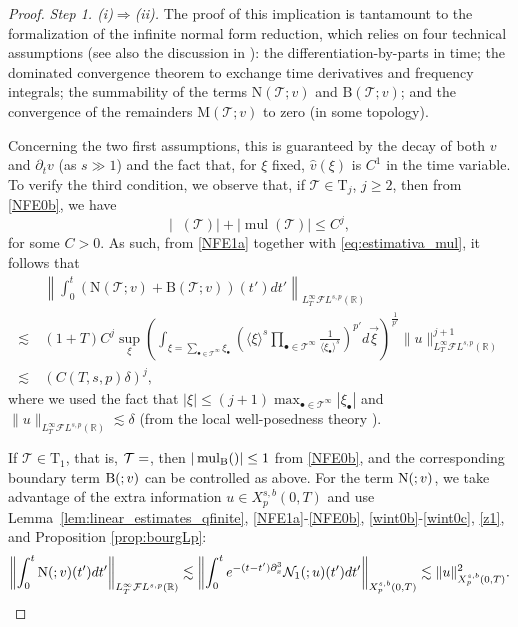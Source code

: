 \documentclass[a4paper,
11pt,  reqno]{amsart}
\makeatletter
\newcommand{\jap}[1]{\langle #1 \rangle}
\newcommand{\5}{\textup{V}}
\newcommand{\FL}{\mathcal{F} L}
\newcommand{\ft}{\widehat}
\newcommand{\dx}{\partial_x}
\newcommand{\dt}{\partial_t}
\theoremstyle{remark}
\newcommand{\R}{\mathbb{R}}
\newcommand{\bul}{\bullet}
\newcommand{\TT}{\mathcal{T}}
\newcommand{\Tr}{\mathrm{T}}
\DeclareMathOperator{\mul}{mul}
\DeclareMathOperator{\mulB}{mul_{\BB}}
\def\<#1>{\csname MH@symb@#1\endcsname}
\numberwithin{equation}{section}
\numberwithin{theorem}{section}
\newcommand{\MM}{\mathrm{M}}
\newcommand{\NN}{\mathrm{N}}
\newcommand{\Ncal}{\mathcal{N}}
\newcommand{\BB}{\mathrm{B}}
\makeatother
\begin{document}
\begin{proof}
    \textit{Step 1. \rm(i)$\Rightarrow$\rm(ii).} The proof of this implication is tantamount to the formalization of the infinite normal form reduction, which relies on four technical assumptions (see also the discussion in \cite[Section 4]{KOY20}): the differentiation-by-parts in time; the dominated convergence theorem to exchange time derivatives and frequency integrals; the summability of the terms $\NN(\TT;v)$ and $\BB(\TT;v)$; and the convergence of the remainders $\MM(\TT;v)$ to zero (in some topology).
	
	Concerning the two first assumptions, this is guaranteed by the decay of both $v$ and $\dt v$ (as $s\gg 1$) and the fact that, for $\xi$ fixed, {$\ft{v}(\xi)$} is $C^1$ in the time variable.
	To verify the third condition, we observe that, if $\TT\in \Tr_{j}$, $j\ge 2$, then from \eqref{NFE0b},  we have
    \begin{equation}\label{eq:estimativa_mul}
        |\mulB(\TT)| + |\mul(\TT)|\le C^j,
    \end{equation}
    for some $C>0$.  
    As such, from \eqref{NFE1a} together with \eqref{eq:estimativa_mul}, it follows that 
	\begin{align*}
	&\left\|\int_0^t(\NN(\TT;v)+\BB(\TT;v))(t')dt'\right\|_{{L^\infty_T }\mathcal{F}L^{s,p}(\R)}\\\lesssim\ & (1+T)C^j\sup_\xi \left( \int_{\xi=\sum_{\bul\in\TT^\infty}\xi_\bul} \left(\jap{\xi}^{s}\prod_{{\bul\in \TT^\infty}} \frac{1}{\jap{\xi_\bul}^{s}}\right)^{p'} d\vec{\xi} \right)^{\frac{1}{p'}}\|u\|_{L
    ^\infty_T \mathcal{F}L^{s,p}(\R)}^{j+1}\\\lesssim\ & (C(T,s,p)\delta)^j,
	\end{align*}
    where we used the fact that $|\xi|\le (j+1)\max_{\bul\in\TT^\infty}|\xi_\bul|$ and $\|u\|_{L
    ^\infty_T \mathcal{F}L^{s,p}(\R)}\lesssim \delta$ (from the local well-posedness theory \cite{Grunrock_ldv_hier}).
  
    
    If $\TT\in \Tr_1$, that is, $\TT=\<1>$, then $|\mulB(\<1>)|\le 1$ from \eqref{NFE0b}, and the corresponding boundary term $\BB(\<1>;v)$ can be controlled as above. For the term $\NN(\<1>;v)$, we take advantage of the extra information $u\in X^{s,b}_p(0,T)$ and use 
    { Lemma~\ref{lem:linear_estimates_qfinite}, \eqref{NFE1a}-\eqref{NFE0b}, \eqref{wint0b}-\eqref{wint0c}, 
    \eqref{z1}, and} 
    Proposition \ref{prop:bourgLp}:
    {
    \begin{equation}
\left\|\int_0^t \NN(\<1>;v)(t')dt'\right\|_{L^\infty_T\FL^{s,p}(\R)} \lesssim \left\|\int_0^t e^{-(t-t')\dx^3} \Ncal_1(\<1>;u)(t')dt'\right\|_{X^{s,b}_p(0,T)} \lesssim \|u\|_{X^{s,b}_p(0,T)}^2
.
    \end{equation}
}


\end{proof}
\end{document}
